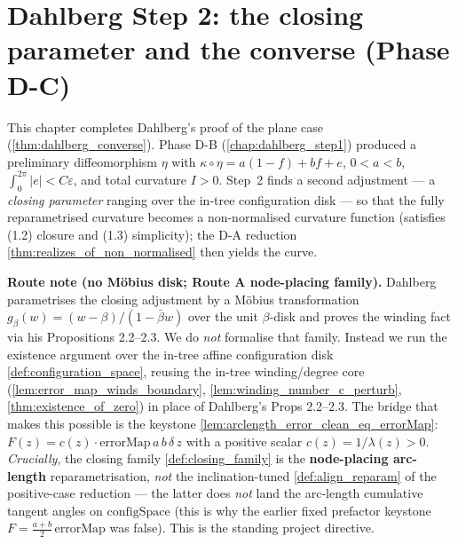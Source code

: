 \chapter{Dahlberg Step 2: the closing parameter and the converse (Phase D-C)}
\label{chap:dahlberg_step2}


This chapter completes Dahlberg's proof of the plane case
(\cref{thm:dahlberg_converse}). Phase D-B (\cref{chap:dahlberg_step1}) produced a
preliminary diffeomorphism $\eta$ with $\kappa\circ\eta=a(1-f)+bf+e$, $0<a<b$,
$\int_0^{2\pi}|e|<C\varepsilon$, and total curvature $I>0$. Step~2 finds a second
adjustment --- a \emph{closing parameter} ranging over the in-tree configuration
disk --- so that the fully reparametrised curvature becomes a non-normalised
curvature function (satisfies (1.2) closure and (1.3) simplicity); the D-A
reduction \cref{thm:realizes_of_non_normalised} then yields the curve.

\medskip\noindent\textbf{Route note (no Möbius disk; Route A node-placing family).}
Dahlberg parametrises the closing adjustment by a Möbius transformation
$g_\beta(w)=(w-\beta)/(1-\bar\beta w)$ over the unit $\beta$-disk and proves the
winding fact via his Propositions 2.2--2.3. We do \emph{not} formalise that family.
Instead we run the existence argument over the in-tree affine configuration disk
\cref{def:configuration_space}, reusing the in-tree winding/degree core
(\cref{lem:error_map_winds_boundary}, \cref{lem:winding_number_c_perturb},
\cref{thm:existence_of_zero}) in place of Dahlberg's Props 2.2--2.3. The bridge
that makes this possible is the keystone
\cref{lem:arclength_error_clean_eq_errorMap}:
$F(z)=c(z)\cdot\mathrm{errorMap}\,a\,b\,\delta\,z$ with a positive scalar
$c(z)=1/\lambda(z)>0$. \emph{Crucially}, the closing family
\cref{def:closing_family} is the \textbf{node-placing arc-length}
reparametrisation, \emph{not} the inclination-tuned \cref{def:align_reparam} of the
positive-case reduction --- the latter does \emph{not} land the arc-length
cumulative tangent angles on $\mathrm{configSpace}$ (this is why the earlier fixed
prefactor keystone $F=\tfrac{a+b}{2}\,\mathrm{errorMap}$ was false). This is the
standing project directive.

